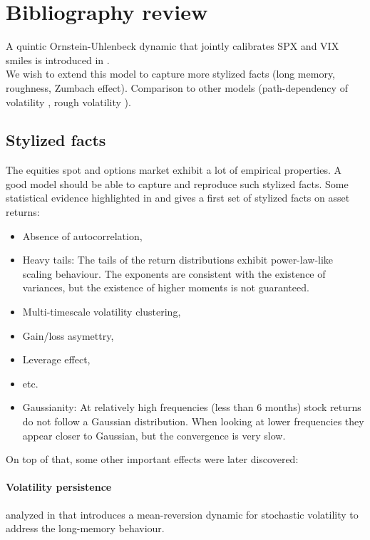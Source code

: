 \section{Bibliography review}

A quintic Ornstein-Uhlenbeck dynamic that jointly calibrates SPX and VIX smiles is introduced in \cite{jaber2022quintic, jaber2022joint}.\\

We wish to extend this model to capture more stylized facts (long memory, roughness, Zumbach effect).\newline
Comparison to other models (path-dependency of volatility \cite{guyon2023volatility}, rough volatility \cite{gatheral2020quadratic}).

\subsection{Stylized facts}

The equities spot and options market exhibit a lot of empirical properties. A good model should be able to capture and reproduce such stylized facts.\newline
Some statistical evidence highlighted in \cite{cont2001empirical} and \cite{LeBaron2001} gives a first set of stylized facts on asset returns:

\begin{itemize}
    \item Absence of autocorrelation,
    \item Heavy tails: The tails of the return distributions exhibit power-law-like scaling behaviour. The exponents are consistent with the existence of variances, but the existence of higher moments is not guaranteed.
    \item Multi-timescale volatility clustering,
    \item Gain/loss asymettry,
    \item Leverage effect, 
    \item etc.
    \item Gaussianity: At relatively high frequencies (less than 6 months) stock
    returns do not follow a Gaussian distribution. When looking at lower frequencies they appear closer to Gaussian, but the convergence is very slow.
\end{itemize}

On top of that, some other important effects were later discovered:

\paragraph{Volatility persistence} analyzed in \cite{comte1998long} that introduces a mean-reversion dynamic for stochastic volatility to address the long-memory behaviour.

